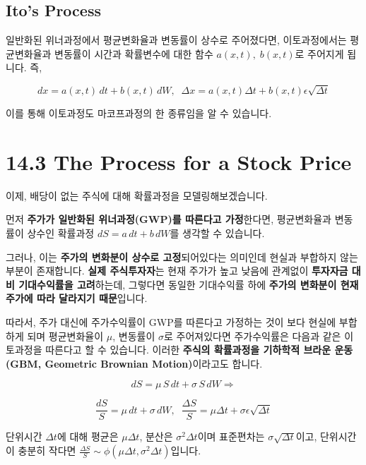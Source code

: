 \documentclass[
  letterpaper,
  DIV=11,
  numbers=noendperiod]{scrreprt}
\begin{document}
\subsection*{Ito's Process}\label{itos-process}

일반화된 위너과정에서 평균변화율과 변동률이 상수로 주어졌다면,
이토과정에서는 평균변화율과 변동률이 시간과 확률변수에 대한 함수
\(a(x,t),\;b(x,t)\)로 주어지게 됩니다. 즉,

\[dx=a(x,t)\,dt+b(x,t)\,dW,\;\;\Delta x=a(x,t)\Delta t+b(x,t)\epsilon\sqrt{\Delta t}\]

이를 통해 이토과정도 마코프과정의 한 종류임을 알 수 있습니다.

\section*{14.3 The Process for a Stock
Price}\label{the-process-for-a-stock-price}


이제, 배당이 없는 주식에 대해 확률과정을 모델링해보겠습니다.

먼저 \textbf{주가가 일반화된 위너과정(GWP)를 따른다고 가정}한다면,
평균변화율과 변동률이 상수인 확률과정 \(dS=a\,dt+b\,dW\)를 생각할 수
있습니다.

그러나, 이는 \textbf{주가의 변화분이 상수로 고정}되어있다는 의미인데
현실과 부합하지 않는 부분이 존재합니다. \textbf{실제 주식투자자}는 현재
주가가 높고 낮음에 관계없이 \textbf{투자자금 대비 기대수익률을
고려}하는데, 그렇다면 동일한 기대수익률 하에 \textbf{주가의 변화분이
현재 주가에 따라 달라지기 때문}입니다.

따라서, 주가 대신에 주가수익률이 GWP를 따른다고 가정하는 것이 보다
현실에 부합하게 되며 평균변화율이 \(\mu\), 변동률이 \(\sigma\)로
주어져있다면 주가수익률은 다음과 같은 이토과정을 따른다고 할 수
있습니다. 이러한 \textbf{주식의 확률과정을 기하학적 브라운 운동(GBM,
Geometric Brownian Motion)}이라고도 합니다.

\[dS=\mu\,S\,dt+\sigma\,S\,dW \Rightarrow\]

\[\frac{dS}{S}=\mu\,dt+\sigma\,dW,\;\;\frac{\Delta S}{S}=\mu\Delta t+\sigma\epsilon\sqrt{\Delta t}\]

단위시간 \(\Delta t\)에 대해 평균은 \(\mu\Delta t\), 분산은
\(\sigma^2\Delta t\)이며 표준편차는 \(\sigma\sqrt{\Delta t}\)이고,
단위시간이 충분히 작다면
\(\frac{\Delta S}{S}\sim\phi(\mu\Delta t,\sigma^2\Delta t)\)입니다.
\end{document}
